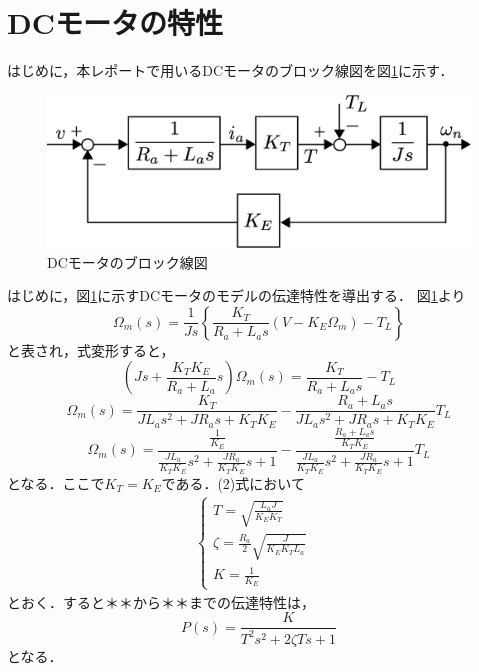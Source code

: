 \documentclass[a4paper,12pt]{jarticle}
\begin{document}
\section{DCモータの特性}
はじめに，本レポートで用いるDCモータのブロック線図を図\ref{fig:DC_model}に示す．
%
\begin{figure}[bp]
 \begin{center}
  \includegraphics[width = 150mm]{fig/DC_model.eps}
 \end{center}
 \caption{DCモータのブロック線図}
 \label{fig:DC_model}
\end{figure}
%
\newpage
%
はじめに，図\ref{fig:DC_model}に示すDCモータのモデルの伝達特性を導出する．
図\ref{fig:DC_model}より
%
\begin{equation}
 \Omega_m(s)=\frac{1}{Js}\left\{\frac{K_T}{R_{a}+L_{a}s}(V-K_E\Omega_m)-T_L\right\}
\end{equation}
と表され，式変形すると，
\begin{equation*}
 \left(Js+\frac{K_{T}K_{E}}{R_{a}+L_{a}}s\right)\Omega_m(s)=\frac{K_{T}}{R_{a}+L_{a}s}-T_L
\end{equation*}
%
\begin{equation*}
 \Omega_m(s)=\frac{K_T}{JL_{a}s^2+JR_{a}s+K_TK_E}-\frac{R_{a}+L_{a}s}{JL_{a}s^2+JR_{a}s+K_TK_E}T_L
\end{equation*}
%
\begin{equation}
 \Omega_m(s)=\frac{\frac{1}{K_E}}{\frac{JL_a}{K_{T}K_E}s^2+\frac{JR_a}{K_{T}K_E}s+1}-\frac{\frac{R_{a}+L_{a}s}{K_{T}K_E}}{\frac{JL_a}{K_{T}K_E}s^2+\frac{JR_a}{K_{T}K_E}s+1}T_L
\end{equation}
%
となる．ここで$K_T=K_E$である．(2)式において
\begin{eqnarray}
 \begin{cases}
  T = \sqrt{\frac{L_{a}J}{K_{E}K_T}} & \\
  \zeta= \frac{R_a}{2}\sqrt{\frac{J}{K_{E}K_{T}L_a}} & \\
  K = \frac{1}{K_E}
 \end{cases}
\end{eqnarray}
とおく．すると＊＊から＊＊までの伝達特性は，
\begin{equation}\label{equ:plant}
 P(s)=\frac{K}{T^2s^2+2\zeta Ts+1}
\end{equation}
となる．
\end{document}
